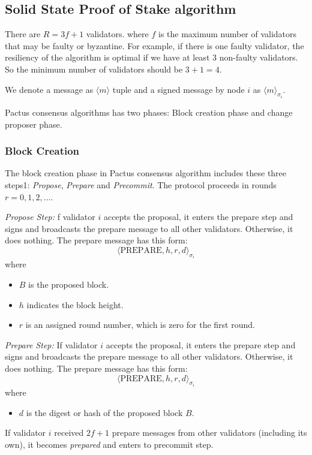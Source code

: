 \documentclass{novel}
\begin{document}
\subsection{Solid State Proof of Stake algorithm}
There are $R = 3f+1$  validators. where $f$ is the maximum number of validators that may be faulty or byzantine. For example, if there is one faulty validator, the resiliency of the algorithm is optimal if we have at least 3 non-faulty validators. So the minimum number of validators should be $3+1=4$.

We denote a message as $\langle m \rangle$ tuple and a signed message by node $i$ as $\langle m \rangle_{\sigma_i}$.

Pactus consensus algorithms has two phases: Block creation phase and change proposer phase.

\subsubsection{Block Creation}
The block creation phase in Pactus consensus algorithm includes these three steps1: \emph{Propose}, \emph{Prepare} and \emph{Precommit}. The protocol proceeds in rounds $r = 0, 1, 2, \ldots$.


\noindent \emph{Propose Step:} f validator $i$ accepts the proposal, it enters the prepare step and signs and broadcasts the prepare message to all other validators. Otherwise, it does nothing. The prepare message has this form:
\begin{equation*}
  \langle \text{PREPARE},h,r,d \rangle_{\sigma_i}
\end{equation*}
where
\begin{itemize}
  \item $B$ is the proposed block.
  \item $h$ indicates the block height.
  \item $r$ is an assigned round number, which is zero for the first round.
\end{itemize}

\noindent \emph{Prepare Step:} If validator $i$ accepts the proposal, it enters the prepare step and signs and broadcasts the prepare message to all other validators. Otherwise, it does nothing. The prepare message has this form:
\begin{equation}
  \langle \text{PREPARE},h,r,d \rangle_{\sigma_i}
\end{equation}
where
\begin{itemize}
  \item $d$  is the digest or hash of the proposed block $B$.
\end{itemize}
If validator $i$ received $2f+1$ prepare messages from other validators (including its own), it becomes \emph{prepared} and enters to precommit step.
\end{document}
